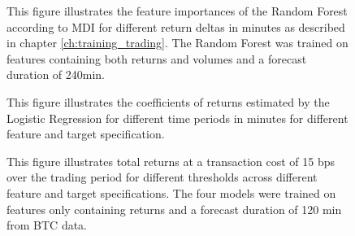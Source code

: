 \begin{figure}[H]
    \captionsetup{format=plain}
    \caption{ 
            This figure illustrates the feature importances of the Random Forest according to MDI \cite{louppe2015variableImportance}
            for different return deltas in minutes as described in chapter \ref{ch:training_trading}. 
            The Random Forest was trained on features containing both returns and volumes and a forecast duration of 240min.
        }
    \label{fig:forest_return_feature_importance_with_volume_240min}
\end{figure}

\begin{figure}[H]
    \captionsetup{format=plain}
    \caption{ 
            This figure illustrates the coefficients of returns estimated by the Logistic Regression
            for different time periods in minutes for different feature and target specification.
        }
    \label{fig:logistic_return_coefficients}
\end{figure}


\begin{figure}[H]
    \captionsetup{format=plain}
    \caption{ 
        This figure illustrates total returns at a transaction cost of 15 bps over the trading period 
        for different thresholds across different feature and target specifications.
        The four models were trained on features only containing returns and a forecast duration of 120 min from BTC data.
        }
    \label{fig:btc_threshold_vs_return_15bps}
\end{figure}


\pagebreak
